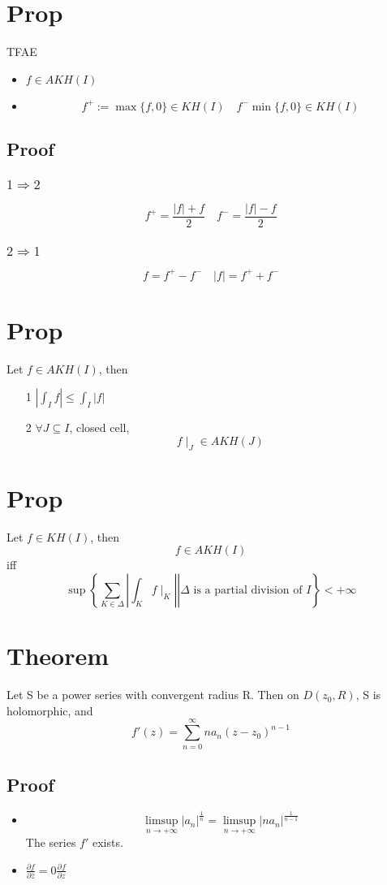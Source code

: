 \documentclass{book}
\newcommand{\abs}[1]{\left\lvert #1 \right\rvert}
\newcommand{\fpartial}[3][]{\frac{\partial^{#1} #2}{\partial #3^{#1}}}
\begin{document}
\section{Prop}TFAE
\begin{itemize}
    \item $f\in AKH(I)$
    \item $$f^+:=\max\{f,0\}\in KH(I)\quad f^-\min\{f,0\}\in KH(I)$$
\end{itemize}
\subsection*{Proof}
\subsubsection{$1\Rightarrow2$}
$$f^+=\frac{\abs f+f}2\quad f^-=\frac{\abs f-f}2$$
\subsubsection{$2\Rightarrow1$}
$$f=f^+-f^-\quad \abs f=f^++f^-$$
\section{Prop}Let $f\in AKH(I)$, then 
\begin{itemize}
    \item [1]$\abs{\int_If}\leq\int_I\abs f$
    \item [2]$\forall J\subseteq I$, closed cell, $$f\mid_J\in AKH(J)$$
\end{itemize}
\section{Prop}
Let $f\in KH(I)$, then $$f\in AKH(I)$$
iff
$$\sup\left\{\left.\sum\limits_{K\in \Delta}\abs{\int_Kf\mid_K}\right|\Delta\text{ is a partial division of }I\right\}<+\infty$$
\section{Theorem}
Let S be a power series with convergent radius R. Then on $D(z_0,R)$, S is holomorphic, and $$f'(z)=\sum\limits_{n=0}^\infty na_n(z-z_0)^{n-1}$$
\subsection*{Proof}
\begin{itemize}
    \item$$\limsup\limits_{n\to+\infty}\abs{a_n}^{\frac{1}n}=\limsup\limits_{n\to+\infty}\abs{na_n}^{\frac{1}{n-1}}$$ The series $f'$ exists.
    \item $\frac{\partial f}{\partial\overline z}=0$$\fpartial{f}{z}$
\end{itemize}
\end{document}
